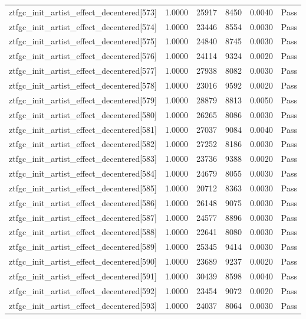 \begin{table}[htbp]
\begin{tabular}{llrrll}
ztfgc\_init\_artist\_effect\_decentered[573] & 1.0000 & 25917 & 8450 & 0.0040 & Pass \\
ztfgc\_init\_artist\_effect\_decentered[574] & 1.0000 & 23446 & 8554 & 0.0030 & Pass \\
ztfgc\_init\_artist\_effect\_decentered[575] & 1.0000 & 24840 & 8745 & 0.0030 & Pass \\
ztfgc\_init\_artist\_effect\_decentered[576] & 1.0000 & 24114 & 9324 & 0.0020 & Pass \\
ztfgc\_init\_artist\_effect\_decentered[577] & 1.0000 & 27938 & 8082 & 0.0030 & Pass \\
ztfgc\_init\_artist\_effect\_decentered[578] & 1.0000 & 23016 & 9592 & 0.0020 & Pass \\
ztfgc\_init\_artist\_effect\_decentered[579] & 1.0000 & 28879 & 8813 & 0.0050 & Pass \\
ztfgc\_init\_artist\_effect\_decentered[580] & 1.0000 & 26265 & 8086 & 0.0030 & Pass \\
ztfgc\_init\_artist\_effect\_decentered[581] & 1.0000 & 27037 & 9084 & 0.0040 & Pass \\
ztfgc\_init\_artist\_effect\_decentered[582] & 1.0000 & 27252 & 8186 & 0.0030 & Pass \\
ztfgc\_init\_artist\_effect\_decentered[583] & 1.0000 & 23736 & 9388 & 0.0020 & Pass \\
ztfgc\_init\_artist\_effect\_decentered[584] & 1.0000 & 24679 & 8055 & 0.0030 & Pass \\
ztfgc\_init\_artist\_effect\_decentered[585] & 1.0000 & 20712 & 8363 & 0.0030 & Pass \\
ztfgc\_init\_artist\_effect\_decentered[586] & 1.0000 & 26148 & 9075 & 0.0030 & Pass \\
ztfgc\_init\_artist\_effect\_decentered[587] & 1.0000 & 24577 & 8896 & 0.0030 & Pass \\
ztfgc\_init\_artist\_effect\_decentered[588] & 1.0000 & 22641 & 8080 & 0.0030 & Pass \\
ztfgc\_init\_artist\_effect\_decentered[589] & 1.0000 & 25345 & 9414 & 0.0030 & Pass \\
ztfgc\_init\_artist\_effect\_decentered[590] & 1.0000 & 23689 & 9237 & 0.0020 & Pass \\
ztfgc\_init\_artist\_effect\_decentered[591] & 1.0000 & 30439 & 8598 & 0.0040 & Pass \\
ztfgc\_init\_artist\_effect\_decentered[592] & 1.0000 & 23454 & 9072 & 0.0020 & Pass \\
ztfgc\_init\_artist\_effect\_decentered[593] & 1.0000 & 24037 & 8064 & 0.0030 & Pass \\

\end{tabular}
\end{table}
